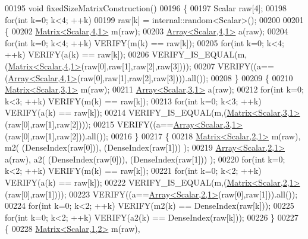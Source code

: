 \begin{DoxyCode}
00195 \textcolor{keywordtype}{void} fixedSizeMatrixConstruction()
00196 \{
00197   Scalar raw[4];
00198   \textcolor{keywordflow}{for}(\textcolor{keywordtype}{int} k=0; k<4; ++k)
00199     raw[k] = internal::random<Scalar>();
00200   
00201   \{
00202     \hyperlink{group___core___module_class_eigen_1_1_matrix}{Matrix<Scalar,4,1>} m(raw);
00203     \hyperlink{group___core___module_class_eigen_1_1_array}{Array<Scalar,4,1>} a(raw);
00204     \textcolor{keywordflow}{for}(\textcolor{keywordtype}{int} k=0; k<4; ++k) VERIFY(m(k) == raw[k]);
00205     \textcolor{keywordflow}{for}(\textcolor{keywordtype}{int} k=0; k<4; ++k) VERIFY(a(k) == raw[k]);    
00206     VERIFY\_IS\_EQUAL(m,(\hyperlink{group___core___module_class_eigen_1_1_matrix}{Matrix<Scalar,4,1>}(raw[0],raw[1],raw[2],raw[3])));
00207     VERIFY((a==(\hyperlink{group___core___module_class_eigen_1_1_array}{Array<Scalar,4,1>}(raw[0],raw[1],raw[2],raw[3]))).all());
00208   \}
00209   \{
00210     \hyperlink{group___core___module}{Matrix<Scalar,3,1>} m(raw);
00211     \hyperlink{group___core___module_class_eigen_1_1_array}{Array<Scalar,3,1>} a(raw);
00212     \textcolor{keywordflow}{for}(\textcolor{keywordtype}{int} k=0; k<3; ++k) VERIFY(m(k) == raw[k]);
00213     \textcolor{keywordflow}{for}(\textcolor{keywordtype}{int} k=0; k<3; ++k) VERIFY(a(k) == raw[k]);
00214     VERIFY\_IS\_EQUAL(m,(\hyperlink{group___core___module}{Matrix<Scalar,3,1>}(raw[0],raw[1],raw[2])));
00215     VERIFY((a==\hyperlink{group___core___module_class_eigen_1_1_array}{Array<Scalar,3,1>}(raw[0],raw[1],raw[2])).all());
00216   \}
00217   \{
00218     \hyperlink{group___core___module_class_eigen_1_1_matrix}{Matrix<Scalar,2,1>} m(raw), m2( (DenseIndex(raw[0])), (DenseIndex(raw[1])) );
00219     \hyperlink{group___core___module_class_eigen_1_1_array}{Array<Scalar,2,1>} a(raw),  a2( (DenseIndex(raw[0])), (DenseIndex(raw[1])) );
00220     \textcolor{keywordflow}{for}(\textcolor{keywordtype}{int} k=0; k<2; ++k) VERIFY(m(k) == raw[k]);
00221     \textcolor{keywordflow}{for}(\textcolor{keywordtype}{int} k=0; k<2; ++k) VERIFY(a(k) == raw[k]);
00222     VERIFY\_IS\_EQUAL(m,(\hyperlink{group___core___module_class_eigen_1_1_matrix}{Matrix<Scalar,2,1>}(raw[0],raw[1])));
00223     VERIFY((a==\hyperlink{group___core___module_class_eigen_1_1_array}{Array<Scalar,2,1>}(raw[0],raw[1])).all());
00224     \textcolor{keywordflow}{for}(\textcolor{keywordtype}{int} k=0; k<2; ++k) VERIFY(m2(k) == DenseIndex(raw[k]));
00225     \textcolor{keywordflow}{for}(\textcolor{keywordtype}{int} k=0; k<2; ++k) VERIFY(a2(k) == DenseIndex(raw[k]));
00226   \}
00227   \{
00228     \hyperlink{group___core___module_class_eigen_1_1_matrix}{Matrix<Scalar,1,2>} m(raw),

\end{DoxyCode}
